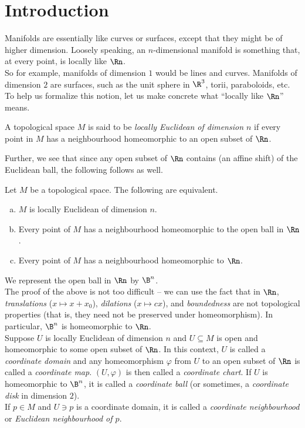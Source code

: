 \section{Introduction}

Manifolds are essentially like curves or surfaces, except that they might be of higher dimension. Loosely speaking, an $n$-dimensional manifold is something that, at every point, is locally like $\Rn$.\\
So for example, manifolds of dimension $1$ would be lines and curves. Manifolds of dimension $2$ are surfaces, such as the unit sphere in $\R^3$, torii, paraboloids, etc.\\
To help us formalize this notion, let us make concrete what ``locally like $\Rn$'' means.

\begin{fdef}
	A topological space $M$ is said to be \textit{locally Euclidean of dimension $n$} if every point in $M$ has a neighbourhood homeomorphic to an open subset of $\Rn$.
\end{fdef}

Further, we see that since any open subset of $\Rn$ contains (an affine shift) of the Euclidean ball, the following follows as well.

\begin{lemma}
	Let $M$ be a topological space. The following are equivalent.
	\begin{enumerate}[(a)]
		\item $M$ is locally Euclidean of dimension $n$.
		\item Every point of $M$ has a neighbourhood homeomorphic to the open ball in $\Rn$.
		\item Every point of $M$ has a neighbourhood homeomorphic to $\Rn$.
	\end{enumerate}
\end{lemma}

We represent the open ball in $\Rn$ by $\B^n$.\\
The proof of the above is not too difficult -- we can use the fact that in $\Rn$, \textit{translations} ($x\mapsto x+x_0$), \textit{dilations} ($x\mapsto cx$), and \textit{boundedness} are not topological properties (that is, they need not be preserved under homeomorphism). In particular, $\B^n$ is homeomorphic to $\Rn$.\\

Suppose $U$ is locally Euclidean of dimension $n$ and $U\subseteq M$ is open and homeomorphic to some open subset of $\Rn$. In this context, $U$ is called a \textit{coordinate domain} and any homeomorphism $\varphi$ from $U$ to an open subset of $\Rn$ is called a \textit{coordinate map}. $(U,\varphi)$ is then called a \textit{coordinate chart}. If $U$ is homeomorphic to $\B^n$, it is called a \textit{coordinate ball} (or sometimes, a \textit{coordinate disk} in dimension $2$).\\
If $p\in M$ and $U\ni p$ is a coordinate domain, it is called a \textit{coordinate neighbourhood} or \textit{Euclidean neighbourhood of $p$}.


